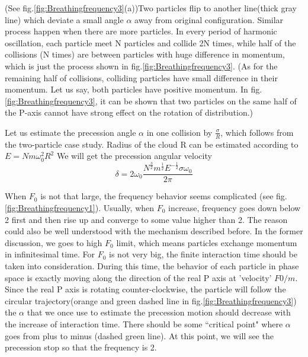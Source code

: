 \documentclass[aps,pre,twocolumn,groupedaddress]{revtex4-1}
\begin{document}
(See fig.\ref{fig:Breathingfrequency3}(a))Two particles flip to another line(thick gray line) which deviate a small angle $\alpha$ away from original configuration. Similar process happen when there are more particles. In every period of harmonic oscillation, each particle meet N particles and collide 2N times, while half of the collisions (N times) are between particles with huge difference in momentum, which is just the process shown in fig.\ref{fig:Breathingfrequency3}. (As for the remaining half of collisions, colliding particles have small difference in their momentum. Let us say, both particles have positive momentum. In fig.\ref{fig:Breathingfrequency3}, it can be shown that two particles on the same half of the P-axis cannot have strong effect on the rotation of distribution.)

Let us estimate the precession angle $\alpha$ in one collision by $\frac{\sigma}{R}$, which follows from the two-particle case study. Radius of the cloud R can be estimated according to $E=Nm\omega_0^2R^2$
We will get the precession angular velocity 
\begin{equation}
\delta=2\omega_0\frac{N^\frac{3}{2}m^{\frac{1}{2}}E^{-\frac{1}{2}}\sigma\omega_0}{2\pi}
\label{eq:breathingfrequency1}
\end{equation}





When $F_0$ is not that large, the frequency behavior seems complicated (see fig.\ref{fig:Breathingfrequency1}). Usually, when $F_0$ increase, frequency goes down below 2 first and then rise up and converge to some value higher than 2. The reason could also be well understood with the mechanism described before. In the former discussion, we goes to high $F_0$ limit, which means particles exchange momentum in infinitesimal time. For $F_0$ is not very big, the finite interaction time should be taken into consideration. During this time, the behavior of each particle in phase space is exactly moving along the direction of the real P axis at 'velocity' $F0/m$. Since the real P axis is rotating counter-clockwise, the particle will follow the circular trajectory(orange and green dashed line in fig.\ref{fig:Breathingfrequency3}) the $\alpha$ that we once use to estimate the precession motion should decrease with the increase of interaction time. There should be some ``critical point" where $\alpha$ goes from plus to minus (dashed green line). At this point, we will see the precession stop so that the frequency is 2. 
\end{document}

